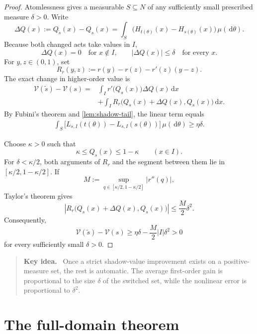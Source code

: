 \documentclass[11pt,a4paper]{article}
\theoremstyle{definition}
\newcommand{\V}{\mathcal V}
\newcommand{\dd}{\,\mathrm d}
\newenvironment{keyidea}
  {\begin{quote}\color{MidnightBlue}\textbf{Key idea.}\ }
  {\end{quote}}
\begin{document}
\begin{proof}
Atomlessness gives a measurable $S\subseteq N$ of any sufficiently small
prescribed measure $\delta>0$. Write
\[
 \Delta Q(x):=Q_{\widetilde s}(x)-Q_s(x)
 =\int_S\bigl(H_{t(\theta)}(x)-H_{s(\theta)}(x)\bigr)
   \,\mu(\dd\theta).
\]
Because both changed acts take values in $I$,
\[
 \Delta Q(x)=0\quad\text{for }x\notin I,
 \qquad
 |\Delta Q(x)|\leq\delta\quad\text{for every }x.
\]
For $y,z\in(0,1)$, set
\[
 R_r(y,z):=r(y)-r(z)-r'(z)(y-z).
\]
The exact change in higher-order value is
\begin{align}
 \V(\widetilde s)-\V(s)
 ={}&\int_I r'\bigl(Q_s(x)\bigr)\Delta Q(x)\dd x
 \nonumber\\
 &+\int_I R_r\bigl(Q_s(x)+\Delta Q(x),Q_s(x)\bigr)\dd x.
 \label{eq:exact-local-change}
\end{align}
By Fubini's theorem and \cref{lem:shadow-tail}, the linear term equals
\begin{align*}
 \int_S
 \bigl[L_{s,I}(t(\theta))-L_{s,I}(s(\theta))\bigr]
 \,\mu(\dd\theta)
 \geq\eta\delta.
\end{align*}

Choose $\kappa>0$ such that
\[
 \kappa\leq Q_s(x)\leq1-\kappa
 \qquad(x\in I).
\]
For $\delta<\kappa/2$, both arguments of $R_r$ and the segment between them
lie in $[\kappa/2,1-\kappa/2]$. If
\[
 M:=\sup_{q\in[\kappa/2,1-\kappa/2]}|r''(q)|,
\]
Taylor's theorem gives
\[
 \left|R_r\bigl(Q_s(x)+\Delta Q(x),Q_s(x)\bigr)\right|
 \leq\frac{M}{2}\delta^2.
\]
Consequently,
\[
 \V(\widetilde s)-\V(s)
 \geq\eta\delta-\frac{M}{2}|I|\delta^2>0
\]
for every sufficiently small $\delta>0$.
\end{proof}

\begin{keyidea}
Once a strict shadow-value improvement exists on a positive-measure set, the
rest is automatic. The average first-order gain is proportional to the size
$\delta$ of the switched set, while the nonlinear error is proportional to
$\delta^2$.
\end{keyidea}

\section{The full-domain theorem}
\end{document}
